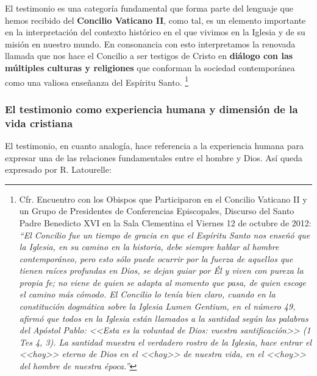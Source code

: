 \documentclass[12pt]{article}
\begin{document}
El testimonio es una categoría fundamental que forma parte del lenguaje que hemos recibido del \textbf{Concilio Vaticano II}, como tal, es un elemento importante en la interpretación del contexto histórico en el que vivimos en la Iglesia y de su misión en nuestro mundo. En consonancia con esto interpretamos la renovada llamada que nos hace el Concilio a ser testigos de Cristo en \textbf{diálogo con las múltiples culturas y religiones} que conforman la sociedad contemporánea como una valiosa enseñanza del Espíritu Santo.
\footnote{ 
Cfr. Encuentro con los Obispos que Participaron en el Concilio Vaticano II y un Grupo de Presidentes de Conferencias Episcopales, Discurso del Santo Padre Benedicto XVI en la Sala Clementina el Viernes 12 de octubre de 2012:
\emph{ ``El Concilio fue un tiempo de gracia en que el Espíritu Santo nos enseñó que la Iglesia, en su camino en la historia, debe siempre hablar al hombre contemporáneo, pero esto sólo puede ocurrir por la fuerza de aquellos que tienen raíces profundas en Dios, se dejan guiar por Él y viven con pureza la propia fe; no viene de quien se adapta al momento que pasa, de quien escoge el camino más cómodo. El Concilio lo tenía bien claro, cuando en la constitución dogmática sobre la Iglesia Lumen Gentium, en el número 49, afirmó que todos en la Iglesia están llamados a la santidad según las palabras del Apóstol Pablo: <<Esta es la voluntad de Dios: vuestra santificación>> (1 Tes 4, 3). La santidad muestra el verdadero rostro de la Iglesia, hace entrar el <<hoy>> eterno de Dios en el <<hoy>> de nuestra vida, en el <<hoy>> del hombre de nuestra época.''
}
}

\subsubsection{El testimonio como experiencia humana y dimensión de la vida cristiana}

El testimonio, en cuanto analogía, hace referencia a la experiencia humana para expresar una de las relaciones fundamentales entre el hombre y Dios. Así queda expresado por R. Latourelle:
\end{document}
